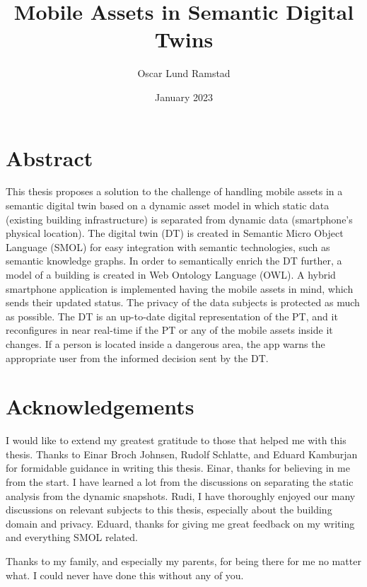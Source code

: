 \documentclass{article}
\begin{document}
\title{Mobile Assets in Semantic Digital Twins}
\author{Oscar Lund Ramstad}
\date{January 2023}

\duoforside[dept={Institute for Informatics}, program={Informatics: Programming and System Architecture}, short]

\section*{Abstract}
This thesis proposes a solution to the challenge of handling mobile assets in a semantic digital twin based on a dynamic asset model in which static data (existing building infrastructure) is separated from dynamic data (smartphone's physical location). The digital twin (DT) is created in Semantic Micro Object Language (SMOL) for easy integration with semantic technologies, such as semantic knowledge graphs. In order to semantically enrich the DT further, a model of a building is created in Web Ontology Language (OWL). A hybrid smartphone application is implemented having the mobile assets in mind, which sends their updated status. The privacy of the data subjects is protected as much as possible. The DT is an up-to-date digital representation of the PT, and it reconfigures in near real-time if the PT or any of the mobile assets inside it changes. If a person is located inside a dangerous area, the app warns the appropriate user from the informed decision sent by the DT.


\newpage

\section*{Acknowledgements}
I would like to extend my greatest gratitude to those that helped me with this thesis. Thanks to Einar Broch Johnsen, Rudolf Schlatte, and Eduard Kamburjan for formidable guidance in writing this thesis. Einar, thanks for believing in me from the start. I have learned a lot from the discussions on separating the static analysis from the dynamic snapshots. Rudi, I have thoroughly enjoyed our many discussions on relevant subjects to this thesis, especially about the building domain and privacy. Eduard, thanks for giving me great feedback on my writing and everything SMOL related.

Thanks to my family, and especially my parents, for being there for me no matter what. I could never have done this without any of you.      
\newpage

\tableofcontents
\newpage
\end{document}
